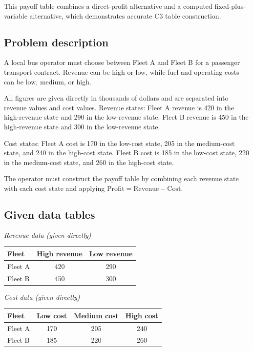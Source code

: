 \begin{ExamProblems}
		This payoff table combines a direct-profit alternative and a computed fixed-plus-variable alternative, which demonstrates accurate C3 table construction.
		
		\item
		\subsection*{Problem description}
		A local bus operator must choose between Fleet A and Fleet B for a passenger transport contract.
		Revenue can be high or low, while fuel and operating costs can be low, medium, or high.
		
		All figures are given directly in thousands of dollars and are separated into revenue values and cost values.
		Revenue states:
		Fleet A revenue is 420 in the high-revenue state and 290 in the low-revenue state.
		Fleet B revenue is 450 in the high-revenue state and 300 in the low-revenue state.
		
		Cost states:
		Fleet A cost is 170 in the low-cost state, 205 in the medium-cost state, and 240 in the high-cost state.
		Fleet B cost is 185 in the low-cost state, 220 in the medium-cost state, and 260 in the high-cost state.
		
		The operator must construct the payoff table by combining each revenue state with each cost state and applying
		\(\text{Profit}=\text{Revenue}-\text{Cost}\).
		\subsection*{Given data tables}
		\begin{center}
			\begin{minipage}[t]{0.48\linewidth}
				\textit{Revenue data (given directly)}
				\begin{center}
					\begin{tabular}{l c c}
						\toprule
						Fleet & High revenue & Low revenue \\
						\midrule
						Fleet A & 420 & 290 \\
						Fleet B & 450 & 300 \\
						\bottomrule
					\end{tabular}
				\end{center}
			\end{minipage}
			\hfill
			\begin{minipage}[t]{0.48\linewidth}
				\textit{Cost data (given directly)}
				\begin{center}
					\begin{tabular}{l c c c}
						\toprule
						Fleet & Low cost & Medium cost & High cost \\
						\midrule
						Fleet A & 170 & 205 & 240 \\
						Fleet B & 185 & 220 & 260 \\
						\bottomrule
					\end{tabular}
				\end{center}
			\end{minipage}
		\end{center}
		

\end{ExamProblems}
